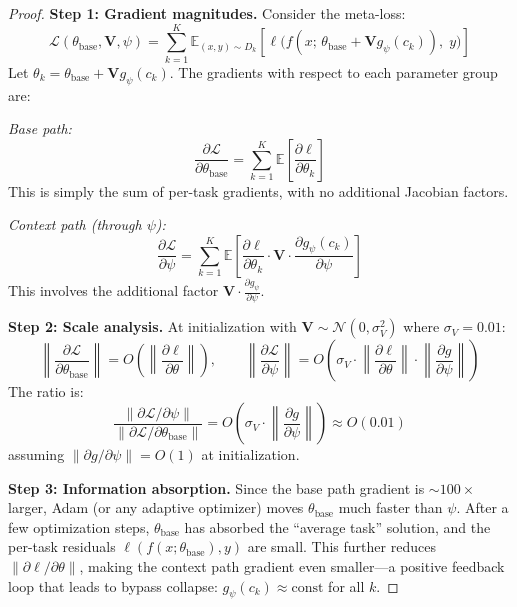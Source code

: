 \documentclass{article}
\begin{document}
\begin{proof}
\textbf{Step 1: Gradient magnitudes.}
Consider the meta-loss:
\begin{equation}
    \mathcal{L}(\theta_\mathrm{base}, \mathbf{V}, \psi) = \sum_{k=1}^K \mathbb{E}_{(x,y) \sim D_k}\left[\ell\bigl(f(x;\, \theta_\mathrm{base} + \mathbf{V} g_\psi(c_k)),\; y\bigr)\right]
\end{equation}
Let $\theta_k = \theta_\mathrm{base} + \mathbf{V} g_\psi(c_k)$. The gradients with respect to each parameter group are:

\emph{Base path:}
\begin{equation}
    \frac{\partial \mathcal{L}}{\partial \theta_\mathrm{base}} = \sum_{k=1}^K \mathbb{E}\left[\frac{\partial \ell}{\partial \theta_k}\right]
\end{equation}
This is simply the sum of per-task gradients, with no additional Jacobian factors.

\emph{Context path (through $\psi$):}
\begin{equation}
    \frac{\partial \mathcal{L}}{\partial \psi} = \sum_{k=1}^K \mathbb{E}\left[\frac{\partial \ell}{\partial \theta_k} \cdot \mathbf{V} \cdot \frac{\partial g_\psi(c_k)}{\partial \psi}\right]
\end{equation}
This involves the additional factor $\mathbf{V} \cdot \frac{\partial g_\psi}{\partial \psi}$.

\textbf{Step 2: Scale analysis.}
At initialization with $\mathbf{V} \sim \mathcal{N}(0, \sigma_V^2)$ where $\sigma_V = 0.01$:
\begin{equation}
    \left\|\frac{\partial \mathcal{L}}{\partial \theta_\mathrm{base}}\right\| = O\left(\left\|\frac{\partial \ell}{\partial \theta}\right\|\right), \qquad
    \left\|\frac{\partial \mathcal{L}}{\partial \psi}\right\| = O\left(\sigma_V \cdot \left\|\frac{\partial \ell}{\partial \theta}\right\| \cdot \left\|\frac{\partial g}{\partial \psi}\right\|\right)
\end{equation}
The ratio is:
\begin{equation}
    \frac{\|\partial \mathcal{L} / \partial \psi\|}{\|\partial \mathcal{L} / \partial \theta_\mathrm{base}\|} = O\left(\sigma_V \cdot \left\|\frac{\partial g}{\partial \psi}\right\|\right) \approx O(0.01)
\end{equation}
assuming $\|\partial g / \partial \psi\| = O(1)$ at initialization.

\textbf{Step 3: Information absorption.}
Since the base path gradient is $\sim 100\times$ larger, Adam (or any adaptive optimizer) moves $\theta_\mathrm{base}$ much faster than $\psi$. After a few optimization steps, $\theta_\mathrm{base}$ has absorbed the ``average task'' solution, and the per-task residuals $\ell(f(x; \theta_\mathrm{base}), y)$ are small. This further reduces $\|\partial \ell / \partial \theta\|$, making the context path gradient even smaller---a positive feedback loop that leads to bypass collapse: $g_\psi(c_k) \approx \mathrm{const}$ for all $k$.


\end{proof}
\end{document}
